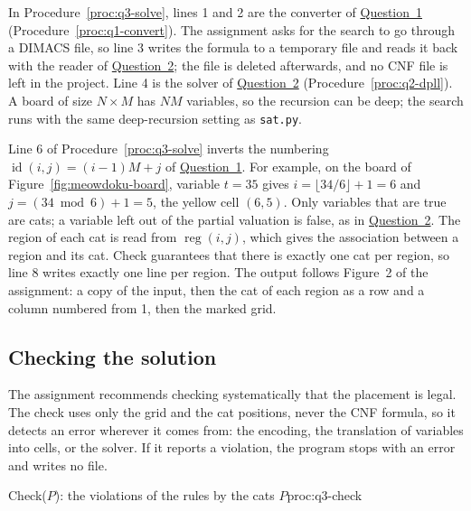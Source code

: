 In Procedure~\ref{proc:q3-solve}, lines 1 and 2 are the converter of \hyperref[sec:q1]{Question~1} (Procedure~\ref{proc:q1-convert}). The assignment asks for the search to go through a DIMACS file, so line 3 writes the formula to a temporary file and reads it back with the reader of \hyperref[sec:q2]{Question~2}; the file is deleted afterwards, and no CNF file is left in the project. Line 4 is the solver of \hyperref[sec:q2]{Question~2} (Procedure~\ref{proc:q2-dpll}). A board of size $N\times M$ has $NM$ variables, so the recursion can be deep; the search runs with the same deep-recursion setting as \texttt{sat.py}.

Line 6 of Procedure~\ref{proc:q3-solve} inverts the numbering $\operatorname{id}(i,j)=(i-1)M+j$ of \hyperref[sec:q1]{Question~1}. For example, on the board of Figure~\ref{fig:meowdoku-board}, variable $t=35$ gives $i=\lfloor34/6\rfloor+1=6$ and $j=(34\bmod6)+1=5$, the yellow cell $(6,5)$. Only variables that are true are cats; a variable left out of the partial valuation is false, as in \hyperref[sec:q2]{Question~2}. The region of each cat is read from $\operatorname{reg}(i,j)$, which gives the association between a region and its cat. Check guarantees that there is exactly one cat per region, so line 8 writes exactly one line per region. The output follows Figure~2 of the assignment: a copy of the input, then the cat of each region as a row and a column numbered from 1, then the marked grid.

\subsection{Checking the solution}

The assignment recommends checking systematically that the placement is legal. The check uses only the grid and the cat positions, never the CNF formula, so it detects an error wherever it comes from: the encoding, the translation of variables into cells, or the solver. If it reports a violation, the program stops with an error and writes no file.

\begin{pseudo}{Check($P$): the violations of the rules by the cats $P$}{proc:q3-check}
\end{pseudo}

